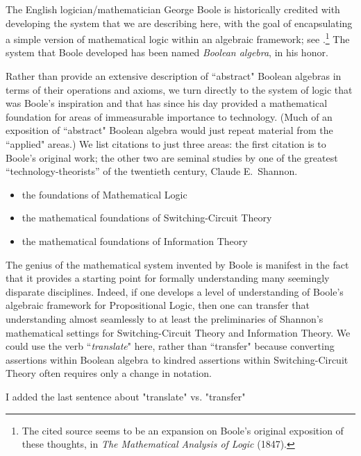 The English logician/mathematician George Boole is historically credited with developing the system that we are describing here, with the goal of encapsulating a simple version of
mathematical logic within an algebraic framework; see
\cite{Boole54}.\footnote{The cited source seems to be an expansion on Boole's original exposition of these thoughts, in {\it The Mathematical Analysis of Logic} (1847).}  The system that Boole developed has been named {\it Boolean algebra}, in his honor.

\smallskip

Rather than provide an extensive description of ``abstract" Boolean algebras in terms of their operations and axioms, we turn directly to the system of logic that was Boole's inspiration and that has since his day provided a mathematical foundation for areas of immeasurable importance to technology.  (Much of an exposition of ``abstract" Boolean algebra would just repeat material from the ``applied" areas.)  We list citations to just three areas: the first citation is to Boole's original work; the other two are seminal studies by one of the greatest ``technology-theorists'' of the twentieth century, Claude E.~Shannon. 
\begin{itemize}
\item
the foundations of Mathematical Logic \cite{Boole54}
\medskip\item
the mathematical foundations of Switching-Circuit Theory \cite{Shannon38}
\medskip\item
the mathematical foundations of Information Theory \cite{Shannon48}
\end{itemize}
The genius of the mathematical system invented by Boole is manifest in the fact that it provides a starting point for formally understanding many seemingly disparate disciplines.  Indeed, if one develops a level of understanding of Boole's algebraic framework for Propositional Logic, then one can transfer that understanding almost seamlessly to at least the preliminaries of Shannon's mathematical settings for Switching-Circuit Theory and Information Theory.  We could use the verb ``{\em translate}" here, rather than ``transfer" because converting assertions within Boolean algebra to kindred assertions within Switching-Circuit Theory often requires only a change in notation.

{\Arny I added the last sentence about "translate" vs. "transfer"}


 

